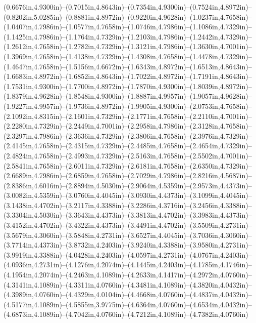 (0.6676in,4.9300in)--(0.7015in,4.8643in)--(0.7354in,4.9300in)--(0.7524in,4.8972in)--(0.8202in,5.0285in)--(0.8881in,4.8972in)--(0.9220in,4.9628in)--(1.0237in,4.7658in)--(1.0407in,4.7986in)--(1.0577in,4.7658in)--(1.0746in,4.7986in)--(1.1086in,4.7329in)--(1.1425in,4.7986in)--(1.1764in,4.7329in)--(1.2103in,4.7986in)--(1.2442in,4.7329in)--(1.2612in,4.7658in)--(1.2782in,4.7329in)--(1.3121in,4.7986in)--(1.3630in,4.7001in)--(1.3969in,4.7658in)--(1.4138in,4.7329in)--(1.4308in,4.7658in)--(1.4478in,4.7329in)--(1.4647in,4.7658in)--(1.5156in,4.6672in)--(1.6343in,4.8972in)--(1.6513in,4.8643in)--(1.6683in,4.8972in)--(1.6852in,4.8643in)--(1.7022in,4.8972in)--(1.7191in,4.8643in)--(1.7531in,4.9300in)--(1.7700in,4.8972in)--(1.7870in,4.9300in)--(1.8039in,4.8972in)--(1.8379in,4.9628in)--(1.8548in,4.9300in)--(1.8887in,4.9957in)--(1.9057in,4.9628in)--(1.9227in,4.9957in)--(1.9736in,4.8972in)--(1.9905in,4.9300in)--(2.0753in,4.7658in)--(2.1092in,4.8315in)--(2.1601in,4.7329in)--(2.1771in,4.7658in)--(2.2110in,4.7001in)--(2.2280in,4.7329in)--(2.2449in,4.7001in)--(2.2958in,4.7986in)--(2.3128in,4.7658in)--(2.3297in,4.7986in)--(2.3636in,4.7329in)--(2.3806in,4.7658in)--(2.3976in,4.7329in)--(2.4145in,4.7658in)--(2.4315in,4.7329in)--(2.4485in,4.7658in)--(2.4654in,4.7329in)--(2.4824in,4.7658in)--(2.4993in,4.7329in)--(2.5163in,4.7658in)--(2.5502in,4.7001in)--(2.5841in,4.7658in)--(2.6011in,4.7329in)--(2.6181in,4.7658in)--(2.6350in,4.7329in)--(2.6689in,4.7986in)--(2.6859in,4.7658in)--(2.7029in,4.7986in)--(2.8216in,4.5687in)--(2.8386in,4.6016in)--(2.8894in,4.5030in)--(2.9064in,4.5359in)--(2.9573in,4.4373in)--(3.0082in,4.5359in)--(3.0760in,4.4045in)--(3.0930in,4.4373in)--(3.1099in,4.4045in)--(3.1438in,4.4702in)--(3.2117in,4.3388in)--(3.2286in,4.3716in)--(3.2456in,4.3388in)--(3.3304in,4.5030in)--(3.3643in,4.4373in)--(3.3813in,4.4702in)--(3.3983in,4.4373in)--(3.4152in,4.4702in)--(3.4322in,4.4373in)--(3.4491in,4.4702in)--(3.5509in,4.2731in)--(3.5679in,4.3060in)--(3.5848in,4.2731in)--(3.6527in,4.4045in)--(3.7036in,4.3060in)--(3.7714in,4.4373in)--(3.8732in,4.2403in)--(3.9240in,4.3388in)--(3.9580in,4.2731in)--(3.9919in,4.3388in)--(4.0428in,4.2403in)--(4.0597in,4.2731in)--(4.0767in,4.2403in)--(4.0936in,4.2731in)--(4.1276in,4.2074in)--(4.1445in,4.2403in)--(4.1785in,4.1746in)--(4.1954in,4.2074in)--(4.2463in,4.1089in)--(4.2633in,4.1417in)--(4.2972in,4.0760in)--(4.3141in,4.1089in)--(4.3311in,4.0760in)--(4.3481in,4.1089in)--(4.3820in,4.0432in)--(4.3989in,4.0760in)--(4.4329in,4.0104in)--(4.4668in,4.0760in)--(4.4837in,4.0432in)--(4.5177in,4.1089in)--(4.5855in,3.9775in)--(4.6364in,4.0760in)--(4.6534in,4.0432in)--(4.6873in,4.1089in)--(4.7042in,4.0760in)--(4.7212in,4.1089in)--(4.7382in,4.0760in)
